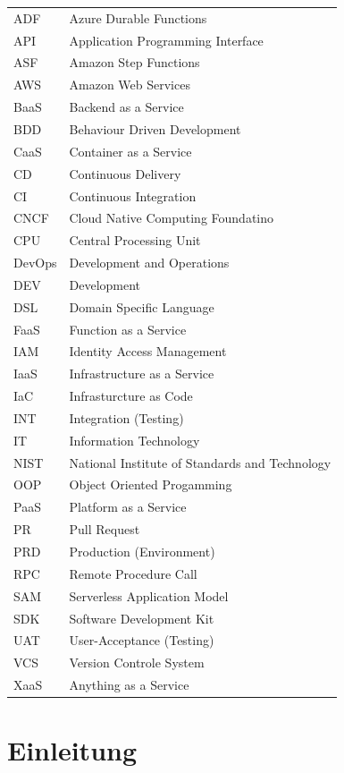 \documentclass[11pt]{article}
\begin{document}
\begin{tabular}{ p{2cm} p{10cm}} 
ADF & Azure Durable Functions \\
API & Application Programming Interface \\
ASF & Amazon Step Functions \\
AWS & Amazon Web Services \\
BaaS & Backend as a Service \\
BDD & Behaviour Driven Development \\
CaaS & Container as a Service \\  
CD & Continuous Delivery \\  
CI & Continuous Integration \\
CNCF & Cloud Native Computing Foundatino \\
CPU & Central Processing Unit \\
DevOps & Development and Operations \\  
DEV & Development \\
DSL & Domain Specific Language \\
FaaS & Function as a Service \\ 
IAM & Identity Access Management \\
IaaS & Infrastructure as a Service \\
IaC & Infrasturcture as Code \\
INT & Integration (Testing) \\
IT & Information Technology \\
NIST & National Institute of Standards and Technology \\
OOP & Object Oriented Progamming \\
PaaS & Platform as a Service \\
PR & Pull Request \\
PRD & Production (Environment) \\
RPC & Remote Procedure Call \\
SAM & Serverless Application Model \\
SDK & Software Development Kit \\
UAT & User-Acceptance (Testing) \\
VCS & Version Controle System \\
XaaS & Anything as a Service \\
\end{tabular}
\newpage
\tableofcontents
\newpage
\section{Einleitung}
\end{document}
